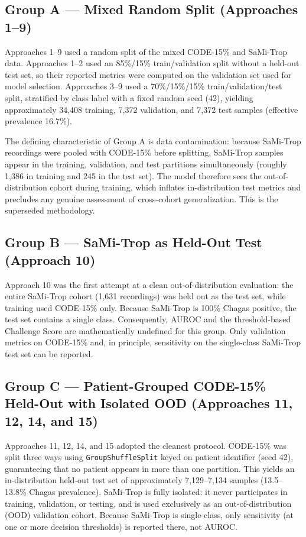 \subsection{Group A --- Mixed Random Split (Approaches 1--9)}

Approaches 1--9 used a random split of the mixed CODE-15\% and SaMi-Trop data. Approaches 1--2 used an 85\%/15\% train/validation split without a held-out test set, so their reported metrics were computed on the validation set used for model selection. Approaches 3--9 used a 70\%/15\%/15\% train/validation/test split, stratified by class label with a fixed random seed (42), yielding approximately 34,408 training, 7,372 validation, and 7,372 test samples (effective prevalence 16.7\%).

The defining characteristic of Group A is data contamination: because SaMi-Trop recordings were pooled with CODE-15\% before splitting, SaMi-Trop samples appear in the training, validation, and test partitions simultaneously (roughly 1,386 in training and 245 in the test set). The model therefore sees the out-of-distribution cohort during training, which inflates in-distribution test metrics and precludes any genuine assessment of cross-cohort generalization. This is the superseded methodology.

\subsection{Group B --- SaMi-Trop as Held-Out Test (Approach 10)}

Approach 10 was the first attempt at a clean out-of-distribution evaluation: the entire SaMi-Trop cohort (1,631 recordings) was held out as the test set, while training used CODE-15\% only. Because SaMi-Trop is 100\% Chagas positive, the test set contains a single class. Consequently, AUROC and the threshold-based Challenge Score are mathematically undefined for this group. Only validation metrics on CODE-15\% and, in principle, sensitivity on the single-class SaMi-Trop test set can be reported.

\subsection{Group C --- Patient-Grouped CODE-15\% Held-Out with Isolated OOD (Approaches 11, 12, 14, and 15)}

Approaches 11, 12, 14, and 15 adopted the cleanest protocol. CODE-15\% was split three ways using \texttt{GroupShuffleSplit} keyed on patient identifier (seed 42), guaranteeing that no patient appears in more than one partition. This yields an in-distribution held-out test set of approximately 7,129--7,134 samples (13.5--13.8\% Chagas prevalence). SaMi-Trop is fully isolated: it never participates in training, validation, or testing, and is used exclusively as an out-of-distribution (OOD) validation cohort. Because SaMi-Trop is single-class, only sensitivity (at one or more decision thresholds) is reported there, not AUROC.

